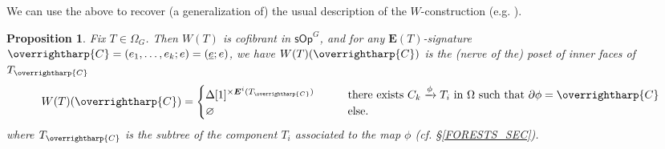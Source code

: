 \documentclass[a4paper,10pt
,draft
]{article}%
\numberwithin{equation}{section}
\numberwithin{figure}{section}
\newtheorem{proposition}[equation]{Proposition}%
\theoremstyle{definition} %
\newcommand{\vect}[1]{\text{\overrightharp{\ensuremath{#1}}}}
\newcommand{\sOp}{\ensuremath{\mathsf{sOp}}}%
\newcommand{\1}{\ensuremath{\mathbbm 1}}%
\begin{document}
We can use the above to recover (a generalization of) the usual description of the $W$-construction (e.g. \cite[\S 4]{CM13b}).
\begin{proposition}
      \label{WT_PROP}
      Fix $T \in \Omega_G$.
      Then $W(T)$ is cofibrant in $\sOp^G$,
      and for any $\boldsymbol{E}(T)$-signature $\vect C = (e_1, \dots, e_k; e) = (\underline{e}; e)$, we have
      $W(T)(\vect C)$ is the (nerve of the) poset of inner faces of $T_{\vect C}$
      \[
            W(T)(\vect C) =
            \begin{cases}
                  \Delta[1]^{\times \boldsymbol{E}^i(T_{\vect C})} \qquad
                  & \mbox{there exists $C_k \xrightarrow{\phi} T_i$ in $\Omega$ such that $\partial\phi=\vect C$}
                  \\
                  \varnothing & \mbox{else.}
            \end{cases}
      \]
      where $T_{\vect C}$ is the subtree of the component $T_i$ associated to the map $\phi$ (cf. \S \ref{FORESTS_SEC}).
\end{proposition}
\end{document}
